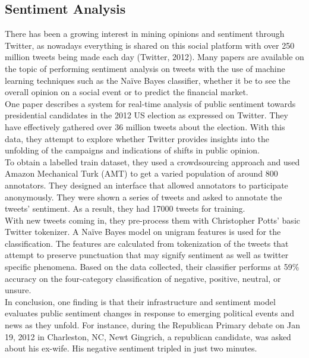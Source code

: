 \documentclass[conference]{IEEEtran}
\begin{document}
	\subsection{Sentiment Analysis}
		{
			There has been a growing interest in mining opinions and sentiment through Twitter, as nowadays everything is shared on this social platform with over 250 million tweets being made each day (Twitter, 2012). Many papers are available on the topic of performing sentiment analysis on tweets with the use of machine learning techniques such as the Naïve Bayes classifier, whether it be to see the overall opinion on a social event or to predict the financial market.\\
			
			One paper describes a system for real-time analysis of public sentiment towards presidential candidates in the 2012 US election as expressed on Twitter. They have effectively gathered over 36 million tweets about the election. With this data, they attempt to explore whether Twitter provides insights into the unfolding of the campaigns and indications of shifts in public opinion.\\

			To obtain a labelled train dataset, they used a crowdsourcing approach and used Amazon Mechanical Turk (AMT) to get a varied population of around 800 annotators. They designed an interface that allowed annotators to participate anonymously. They were shown a series of tweets and asked to annotate the tweets' sentiment. As a result, they had 17000 tweets for training.\\
			
			With new tweets coming in, they pre-process them with Christopher Potts’ basic Twitter tokenizer. A Naïve Bayes model on unigram features is used for the classification. The features are calculated from tokenization of the tweets that attempt to preserve punctuation that may signify sentiment as well as twitter specific phenomena. Based on the data collected, their classifier performs at 59\% accuracy on the four-category classification of negative, positive, neutral, or unsure.\\

			In conclusion, one finding is that their infrastructure and sentiment model evaluates public sentiment changes in response to emerging political events and news as they unfold. For instance, during the Republican Primary debate on Jan 19, 2012 in Charleston, NC, Newt Gingrich, a republican candidate, was asked about his ex-wife. His negative sentiment tripled in just two minutes.
		\par}
	
\end{document}

